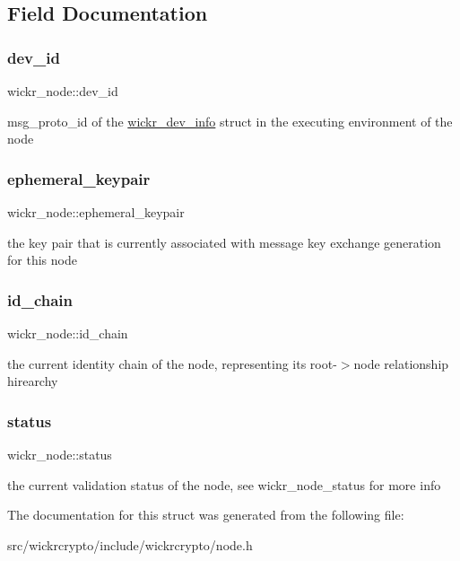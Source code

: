 \subsection{Field Documentation}
\mbox{\label{structwickr__node_a564e42fc1d4b63353d74e5fbf0bead82}} 
\subsubsection{\texorpdfstring{dev\_id}{dev\_id}}
{\footnotesize\ttfamily wickr\+\_\+node\+::dev\+\_\+id}

msg\+\_\+proto\+\_\+id of the \textquotesingle{}\mbox{\hyperlink{structwickr__dev__info}{wickr\+\_\+dev\+\_\+info}}\textquotesingle{} struct in the executing environment of the node \mbox{\label{structwickr__node_a628b61eed5cb17b831ff687143393b93}} 
\subsubsection{\texorpdfstring{ephemeral\_keypair}{ephemeral\_keypair}}
{\footnotesize\ttfamily wickr\+\_\+node\+::ephemeral\+\_\+keypair}

the key pair that is currently associated with message key exchange generation for this node \mbox{\label{structwickr__node_a3a5100ed26ae534e2070623713aacfde}} 
\subsubsection{\texorpdfstring{id\_chain}{id\_chain}}
{\footnotesize\ttfamily wickr\+\_\+node\+::id\+\_\+chain}

the current identity chain of the node, representing its root-\/$>$node relationship hirearchy \mbox{\label{structwickr__node_a659b113832d19162c4d5722777d03c94}} 
\subsubsection{\texorpdfstring{status}{status}}
{\footnotesize\ttfamily wickr\+\_\+node\+::status}

the current validation status of the node, see \textquotesingle{}wickr\+\_\+node\+\_\+status\textquotesingle{} for more info 

The documentation for this struct was generated from the following file\+:\begin{DoxyCompactItemize}
\item 
src/wickrcrypto/include/wickrcrypto/node.\+h\end{DoxyCompactItemize}
